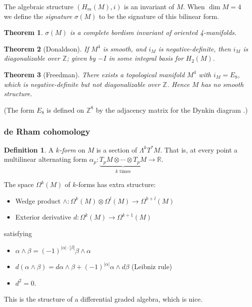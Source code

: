 \documentclass[a4paper]{article}
\newtheorem*{theorem}{Theorem}
\theoremstyle{definition}
\newtheorem*{definition}{Definition}
\theoremstyle{remark}
\newcommand{\Z}{\mathbb{Z}}
\newcommand{\R}{\mathbb{R}}
\begin{document}
The algebraic structure $(H_m(M),i)$ is an invariant of $M$. When $\dim M=4$ we
define the \emph{signature} $\sigma(M)$ to be the signature of this bilinear
form.

\begin{theorem}
    $\sigma(M)$ is a complete bordism invariant of oriented 4-manifolds.
\end{theorem}

\begin{theorem}[Donaldson]
    If $M^4$ is smooth, and $i_M$ is negative-definite, then $i_M$ is
    diagonalizable over $\Z$; given by $-I$ in some integral basis for $H_2(M)$.
\end{theorem}

\begin{theorem}[Freedman]
    There exists a topological manifold $M^4$ with $i_M=E_8$, which is
    negative-definite but not diagonalizable over $\Z$. Hence $M$ has no smooth
    structure.
\end{theorem}

(The form $E_8$ is defined on $\Z^8$ by the adjacency matrix for the Dynkin
diagram .)

\subsubsection*{de Rham cohomology}

\begin{definition}
    A \emph{$k$-form} on $M$ is a section of $\Lambda^kT^*M$. That is, at every
    point a multilinear alternating form
    $\alpha_p:\underbrace{T_pM\otimes\cdots\otimes T_pM}_{\text{$k$ times}}\to\R$.
\end{definition}

The space $\Omega^k(M)$ of $k$-forms has extra structure:
\begin{itemize}
    \item Wedge product $\wedge:\Omega^k(M)\otimes\Omega^l(M)\to\Omega^{k+l}(M)$
    \item Exterior derivative $d:\Omega^k(M)\to\Omega^{k+1}(M)$
\end{itemize}
satisfying
\begin{itemize}
    \item $\alpha\wedge\beta=(-1)^{|\alpha|\cdot|\beta|}\beta\wedge\alpha$
    \item $d(\alpha\wedge\beta)
        = d\alpha\wedge\beta+(-1)^{|\alpha|}\alpha\wedge d\beta$ (Leibniz rule)
    \item $d^2=0$.
\end{itemize}
This is the structure of a differential graded algebra, which is nice.
\end{document}
